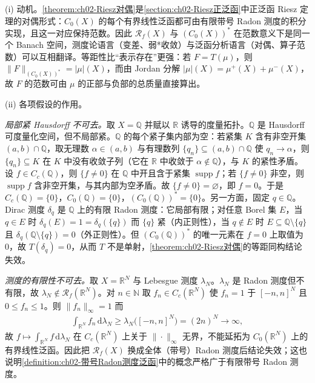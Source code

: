 \documentclass[../../main.tex]{subfiles}%
\begin{document}
\begin{remark}\label{remark:ch02-对偶动机}
(i) 动机。\cref{theorem:ch02-Riesz对偶}是\cref{section:ch02-Riesz正泛函}中正泛函 Riesz 定理的对偶形式：$C_0(X)$ 的每个有界线性泛函都可由有限带号 Radon 测度的积分实现，且这一对应保持范数。因此 $\mathscr R_f(X)$ 与 $(C_0(X))^*$ 在范数意义下是同一个 Banach 空间，测度论语言（变差、弱*收敛）与泛函分析语言（对偶、算子范数）可以互相翻译。等距性比“表示存在”更强：若 $F=T(\mu)$，则 $\|F\|_{(C_0(X))^*}=|\mu|(X)$，而由 Jordan 分解 $|\mu|(X)=\mu^+(X)+\mu^-(X)$，故 $F$ 的范数可由 $\mu$ 的正部与负部的总质量直接算出。

(ii) 各项假设的作用。

\emph{局部紧 Hausdorff 不可去。}取 $X=\mathbb Q$ 并赋以 $\mathbb R$ 诱导的度量拓扑。$\mathbb Q$ 是 Hausdorff 可度量化空间，但不局部紧。$\mathbb Q$ 的每个紧子集内部为空：若紧集 $K$ 含有非空开集 $(a,b)\cap\mathbb Q$，取无理数 $\alpha\in(a,b)$ 与有理数列 $\{q_n\}\subseteq(a,b)\cap\mathbb Q$ 使 $q_n\to\alpha$，则 $\{q_n\}\subseteq K$ 在 $K$ 中没有收敛子列（它在 $\mathbb R$ 中收敛于 $\alpha\notin\mathbb Q$），与 $K$ 的紧性矛盾。设 $f\in C_c(\mathbb Q)$，则 $\{f\neq0\}$ 在 $\mathbb Q$ 中开且含于紧集 $\operatorname{supp}f$；若 $\{f\neq0\}$ 非空，则 $\operatorname{supp}f$ 含非空开集，与其内部为空矛盾。故 $\{f\neq0\}=\varnothing$，即 $f=0$。于是 $C_c(\mathbb Q)=\{0\}$，$C_0(\mathbb Q)=\{0\}$，$(C_0(\mathbb Q))^*=\{0\}$。另一方面，固定 $q\in\mathbb Q$。Dirac 测度 $\delta_q$ 是 $\mathbb Q$ 上的有限 Radon 测度：它局部有限；对任意 Borel 集 $E$，当 $q\in E$ 时 $\delta_q(E)=1=\delta_q(\{q\})$ 而 $\{q\}$ 紧（内正则性），当 $q\notin E$ 时 $E\subseteq\mathbb Q\setminus\{q\}$ 且 $\delta_q(\mathbb Q\setminus\{q\})=0$（外正则性）。但 $(C_0(\mathbb Q))^*$ 的唯一元素在 $f=0$ 上取值为 $0$，故 $T(\delta_q)=0$，从而 $T$ 不是单射，\cref{theorem:ch02-Riesz对偶}的等距同构结论失效。

\emph{测度的有限性不可去。}取 $X=\mathbb R^N$ 与 Lebesgue 测度 $\lambda_N$。$\lambda_N$ 是 Radon 测度但不有限，故 $\lambda_N\notin\mathscr R_f(\mathbb R^N)$。对 $n\in\mathbb N$ 取 $f_n\in C_c(\mathbb R^N)$ 使 $f_n=1$ 于 $[-n,n]^N$ 且 $0\leqslant f_n\leqslant1$。则 $\|f_n\|_\infty=1$ 而
\begin{align*}
\int_{\mathbb R^N}f_n\,\mathrm{d}\lambda_N\geqslant\lambda_N\bigl([-n,n]^N\bigr)=(2n)^N\to\infty,
\end{align*}
故 $f\mapsto\int_{\mathbb R^N}f\,\mathrm{d}\lambda_N$ 在 $C_c(\mathbb R^N)$ 上关于 $\|\cdot\|_\infty$ 无界，不能延拓为 $C_0(\mathbb R^N)$ 上的有界线性泛函。因此把 $\mathscr R_f(X)$ 换成全体（带号）Radon 测度后结论失效；这也说明\cref{definition:ch02-带号Radon测度泛函}中的概念严格广于有限带号 Radon 测度。


\end{remark}
\end{document}
